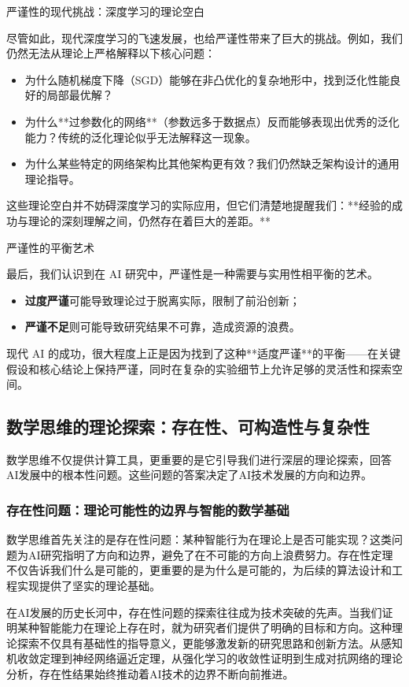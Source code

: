 严谨性的现代挑战：深度学习的理论空白

尽管如此，现代深度学习的飞速发展，也给严谨性带来了巨大的挑战。例如，我们仍然无法从理论上严格解释以下核心问题：

\begin{itemize}
\item 为什么随机梯度下降（SGD）能够在非凸优化的复杂地形中，找到泛化性能良好的局部最优解？
\item 为什么**过参数化的网络**（参数远多于数据点）反而能够表现出优秀的泛化能力？传统的泛化理论似乎无法解释这一现象。
\item 为什么某些特定的网络架构比其他架构更有效？我们仍然缺乏架构设计的通用理论指导。
\end{itemize}

这些理论空白并不妨碍深度学习的实际应用，但它们清楚地提醒我们：**经验的成功与理论的深刻理解之间，仍然存在着巨大的差距。**

严谨性的平衡艺术

最后，我们认识到在 AI 研究中，严谨性是一种需要与实用性相平衡的艺术。
\begin{itemize}
\item \textbf{过度严谨}可能导致理论过于脱离实际，限制了前沿创新；
\item \textbf{严谨不足}则可能导致研究结果不可靠，造成资源的浪费。
\end{itemize}
现代 AI 的成功，很大程度上正是因为找到了这种**适度严谨**的平衡——在关键假设和核心结论上保持严谨，同时在复杂的实验细节上允许足够的灵活性和探索空间。

\subsection{数学思维的理论探索：存在性、可构造性与复杂性}

数学思维不仅提供计算工具，更重要的是它引导我们进行深层的理论探索，回答AI发展中的根本性问题。这些问题的答案决定了AI技术发展的方向和边界。

\subsubsection{存在性问题：理论可能性的边界与智能的数学基础}

数学思维首先关注的是存在性问题：某种智能行为在理论上是否可能实现？这类问题为AI研究指明了方向和边界，避免了在不可能的方向上浪费努力。存在性定理不仅告诉我们什么是可能的，更重要的是为什么是可能的，为后续的算法设计和工程实现提供了坚实的理论基础。

在AI发展的历史长河中，存在性问题的探索往往成为技术突破的先声。当我们证明某种智能能力在理论上存在时，就为研究者们提供了明确的目标和方向。这种理论探索不仅具有基础性的指导意义，更能够激发新的研究思路和创新方法。从感知机收敛定理到神经网络逼近定理，从强化学习的收敛性证明到生成对抗网络的理论分析，存在性结果始终推动着AI技术的边界不断向前推进。

